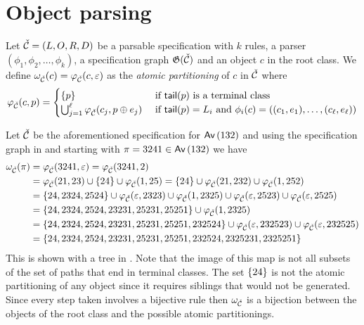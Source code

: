 \section{Object parsing}
Let $\check{\mathcal{C}} = (L,O,R,D)$ be a parsable specification with $k$ rules, a parser $(\phi_1,\phi_2,\dotsc,\phi_k)$, a specification graph $\mathfrak{G}(\check{\mathcal{C}})$ and an object $c$ in the root class. We define $\omega_{\check{\mathcal{C}}}(c) = \varphi_{\check{\mathcal{C}}}(c,\varepsilon)$ as the \emph{atomic partitioning} of $c$ in $\check{\mathcal{C}}$ where \[
    \varphi_{\check{\mathcal{C}}}(c,p) = \begin{cases}
        \left\{p\right\} & \text{ if } \textsf{tail}(p) \text{ is a terminal class}\\
        \bigcup_{j=1}^\ell\varphi_{\check{\mathcal{C}}}(c_j,p \oplus e_j) & \text{ if }
        \textsf{tail}(p) = L_i \text{ and } \phi_i(c) = ((c_1,e_1),\dotsc,(c_\ell,e_\ell))
    \end{cases}
\]

Let $\check{\mathcal{C}}$ be the aforementioned specification for $\textsf{Av}\left(132\right)$ and using the specification graph in  and starting with $\pi=3241 \in \textsf{Av}\left(132\right)$ we have
\begin{align*}
    \omega_{\check{\mathcal{C}}}(\pi) &= \varphi_{\check{\mathcal{C}}}(3241,\varepsilon)
    = \varphi_{\check{\mathcal{C}}}(3241, 2) \\
    &= \varphi_{\check{\mathcal{C}}}(21,23) \cup \left\{24\right\} \cup \varphi_{\check{\mathcal{C}}}(1,25)
    = \left\{24\right\} \cup \varphi_{\check{\mathcal{C}}}(21,232) \cup \varphi_{\check{\mathcal{C}}}(1,252) \\
    &= \left\{24, 2324, 2524\right\} \cup \varphi_{\check{\mathcal{C}}}(\varepsilon,2323) \cup \varphi_{\check{\mathcal{C}}}(1,2325) \cup \varphi_{\check{\mathcal{C}}}(\varepsilon, 2523) \cup  \varphi_{\check{\mathcal{C}}}(\varepsilon, 2525) \\
    &= \left\{24, 2324, 2524, 23231, 25231, 25251\right\} \cup \varphi_{\check{\mathcal{C}}}(1,2325) \\
    &= \left\{24, 2324, 2524, 23231, 25231, 25251, 232524\right\} \cup \varphi_{\check{\mathcal{C}}}(\varepsilon,232523) \cup \varphi_{\check{\mathcal{C}}}(\varepsilon,232525) \\
    &= \left\{24, 2324, 2524, 23231, 25231, 25251, 232524,2325231,2325251\right\}
\end{align*}
This is shown with a tree in . Note that the image of this map is not all subsets of the set of paths that end in terminal classes. The set $\left\{24\right\}$ is not the atomic partitioning of any object since it requires siblings that would not be generated. Since every step taken involves a bijective rule then $\omega_{\check{\mathcal{C}}}$ is a bijection between the objects of the root class and the possible atomic partitionings.

